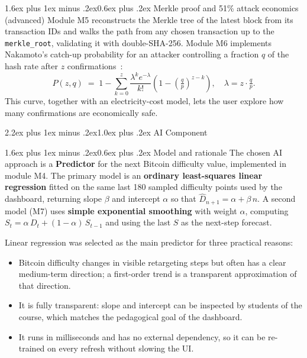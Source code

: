 \documentclass[11pt,a4paper]{article}
\makeatletter
\renewcommand{\section}{\@startsection{section}{1}{0pt}%
  {2.2ex plus 1ex minus .2ex}{1.0ex plus .2ex}%
  {\color{btcgreen}\large\bfseries\sffamily}}
\renewcommand{\subsection}{\@startsection{subsection}{2}{0pt}%
  {1.6ex plus 1ex minus .2ex}{0.6ex plus .2ex}%
  {\color{btcgreensoft!60!black}\normalsize\bfseries\sffamily}}
\makeatother
\begin{document}
\subsection{Merkle proof and 51\% attack economics (advanced)}
Module M5 reconstructs the Merkle tree of the latest block from its
transaction IDs and walks the path from any chosen transaction up to the
\texttt{merkle\_root}, validating it with double-SHA-256. Module M6 implements
Nakamoto's catch-up probability for an attacker controlling a fraction $q$ of
the hash rate after $z$ confirmations~\cite[\S11]{nakamoto2008}:
\[
    P(z, q) \;=\; 1 - \sum_{k=0}^{z}
    \frac{\lambda^{k} e^{-\lambda}}{k!}
    \left( 1 - \left( \tfrac{q}{p} \right)^{z-k} \right),
    \quad \lambda = z \cdot \tfrac{q}{p}.
\]
This curve, together with an electricity-cost model, lets the user explore
how many confirmations are economically safe.

\section{AI Component}

\subsection{Model and rationale}
The chosen AI approach is a \textbf{Predictor} for the next Bitcoin
difficulty value, implemented in module M4. The primary model is an
\textbf{ordinary least-squares linear regression} fitted on the same last 180
sampled difficulty points used by the dashboard, returning slope $\beta$ and intercept
$\alpha$ so that
$\hat{D}_{n+1} = \alpha + \beta\,n$.
A second model (M7) uses \textbf{simple exponential smoothing} with weight
$\alpha$, computing $S_t = \alpha\,D_t + (1-\alpha)\,S_{t-1}$ and using the
last $S$ as the next-step forecast.

Linear regression was selected as the main predictor for three practical
reasons:
\begin{itemize}\setlength\itemsep{2pt}\setlength\leftmargini{1.2em}
    \item Bitcoin difficulty changes in visible retargeting steps but often
    has a clear medium-term direction; a first-order trend is a transparent
    approximation of that direction.
    \item It is fully transparent: slope and intercept can be inspected by
    students of the course, which matches the pedagogical goal of the
    dashboard.
    \item It runs in milliseconds and has no external dependency, so it can
    be re-trained on every refresh without slowing the UI.
\end{itemize}
\end{document}
